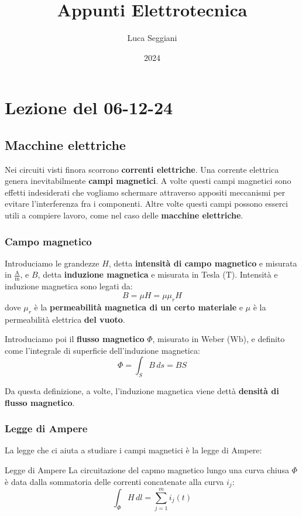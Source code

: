 \documentclass[a4paper,11pt]{article}
\title{Appunti Elettrotecnica}
\author{Luca Seggiani}
\date{2024}
\begin{document}
\section{Lezione del 06-12-24}

\thispagestyle{empty}
\pagestyle{fancy}

\subsection{Macchine elettriche}
Nei circuiti visti finora scorrono \textbf{correnti elettriche}.
Una corrente elettrica genera inevitabilmente \textbf{campi magnetici}.
A volte questi campi magnetici sono effetti indesiderati che vogliamo schermare attraverso appositi meccanismi per evitare l'interferenza fra i componenti.
Altre volte questi campi possono esserci utili a compiere lavoro, come nel caso delle \textbf{macchine elettriche}.

\subsubsection{Campo magnetico}
Introduciamo le grandezze $H$, detta \textbf{intensità di campo magnetico} e misurata in $\frac{\mathrm{A}}{\mathrm{m}}$, e $B$, detta \textbf{induzione magnetica} e misurata in Tesla ($\mathrm{T}$).
Intensità e induzione magnetica sono legati da:
$$
B = \mu H = \mu \mu_r H
$$
dove $\mu_r$ è la \textbf{permeabilità magnetica di un certo materiale} e $\mu$ è la permeabilità elettrica \textbf{del vuoto}.

Introduciamo poi il \textbf{flusso magnetico} $\Phi$, misurato in Weber ($\mathrm{Wb}$), e definito come l'integrale di superficie dell'induzione magnetica:
$$
\Phi = \int_S B \, ds = BS
$$

Da questa definizione, a volte, l'induzione magnetica viene dettà \textbf{densità di flusso magnetico}.

\subsubsection{Legge di Ampere}
La legge che ci aiuta a studiare i campi magnetici è la legge di Ampere:
\begin{theorem}{Legge di Ampere}
	La circuitazione  del capmo magnetico lungo una curva chiusa $\Phi$ è data dalla sommatoria delle correnti concatenate alla curva $i_j$:
	$$
	\int_\Phi H \, dl = \sum_{j=1}^m i_j(t)
	$$
\end{theorem}
\end{document}
